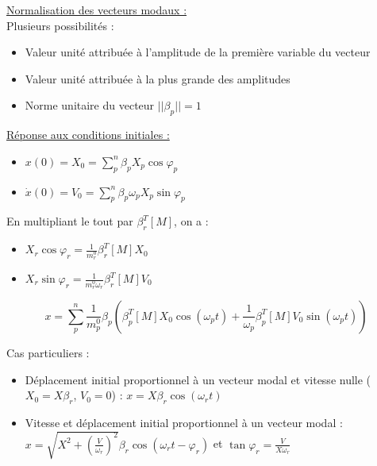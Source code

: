 \documentclass[../main.tex]{subfiles}
\begin{document}
\quad \underline{Normalisation des vecteurs modaux :}\\
Plusieurs possibilités : \begin{itemize}
    \item Valeur unité attribuée à l'amplitude de la première variable du vecteur\\
    \item Valeur unité attribuée à la plus grande des amplitudes\\
    \item Norme unitaire du vecteur $\lvert \lvert \beta_p\rvert \rvert = 1$\\
\end{itemize}

\quad \underline{Réponse aux conditions initiales :}\\
\begin{itemize}
    \item $x(0) = X_0 = \sum_p^n \beta_p X_p \cos\varphi_p$\\
    \item $\dot{x}(0)= V_0 = \sum_p^n \beta_p\omega_p X_p \sin\varphi_p$\\
\end{itemize}

En multipliant le tout par $\beta_r^T [M]$, on a : \begin{itemize}
    \item $X_r \cos\varphi_r = \frac{1}{m_r^0} \beta_r^T [M] X_0$\\
    \item $X_r \sin\varphi_r = \frac{1}{m_r^0 \omega_r} \beta_r^T [M] V_0$\\
\end{itemize}

\begin{equation}
    x = \sum_p^n \frac{1}{m_p^0} \beta_p (\beta_p^T[M]X_0 \cos(\omega_pt) + \frac{1}{\omega_p} \beta_p^T [M] V_0 \sin(\omega_pt))
\end{equation}

Cas particuliers : \begin{itemize}
    \item Déplacement initial proportionnel à un vecteur modal et vitesse nulle ($X_0 = X\beta_r$, $V_0 = 0$) : $x = X\beta_r \cos(\omega_rt)$\\
    \item Vitesse et déplacement initial proportionnel à un vecteur modal : $x = \sqrt{X^2 + (\frac{V}{\omega_r})^2} \beta_r \cos(\omega_rt-\varphi_r)$ et $\tan\varphi_r = \frac{V}{X\omega_r}$\\
\end{itemize}
\end{document}
